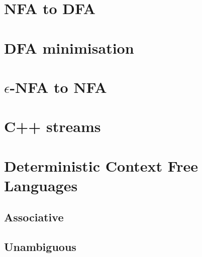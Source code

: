 \documentclass[a4paper,12pt]{article}
\begin{document}
\section{NFA to DFA}

\section{DFA minimisation}

\section{\(\epsilon\)-NFA to NFA}

\section{C++ streams}

\section{Deterministic Context Free Languages}
\subsection{Associative}
\subsection{Unambiguous}
\end{document}
